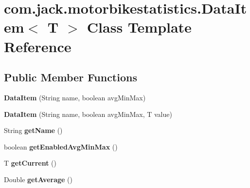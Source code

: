 \hypertarget{classcom_1_1jack_1_1motorbikestatistics_1_1_data_item}{}\section{com.\+jack.\+motorbikestatistics.\+Data\+Item$<$ T $>$ Class Template Reference}
\label{classcom_1_1jack_1_1motorbikestatistics_1_1_data_item}
\subsection*{Public Member Functions}
\begin{DoxyCompactItemize}
\item 
\mbox{\label{classcom_1_1jack_1_1motorbikestatistics_1_1_data_item_ae7367bc22bb0d8dc831944c7ce4f39f9}} 
{\bfseries Data\+Item} (String name, boolean avg\+Min\+Max)
\item 
\mbox{\label{classcom_1_1jack_1_1motorbikestatistics_1_1_data_item_a5bb494fbf02f8157b859694d3c2671d6}} 
{\bfseries Data\+Item} (String name, boolean avg\+Min\+Max, T value)
\item 
\mbox{\label{classcom_1_1jack_1_1motorbikestatistics_1_1_data_item_ae0beb1548c3ca85be62eb2e94e9def65}} 
String {\bfseries get\+Name} ()
\item 
\mbox{\label{classcom_1_1jack_1_1motorbikestatistics_1_1_data_item_af9fd13d6997dbf73dfacaaa33f6f3d9e}} 
boolean {\bfseries get\+Enabled\+Avg\+Min\+Max} ()
\item 
\mbox{\label{classcom_1_1jack_1_1motorbikestatistics_1_1_data_item_aad19eefe19453103b36ceabca8b1154c}} 
T {\bfseries get\+Current} ()
\item 
\mbox{\label{classcom_1_1jack_1_1motorbikestatistics_1_1_data_item_af8e5083ad7651708f7def6b488e881d2}} 
Double {\bfseries get\+Average} ()
\item 

\end{DoxyCompactItemize}

